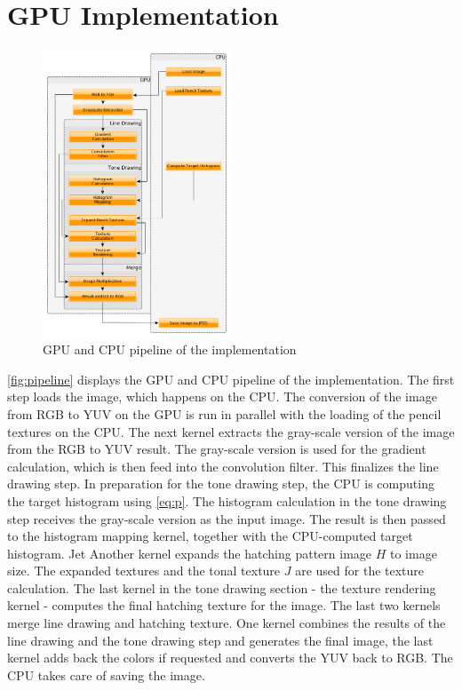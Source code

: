\section{GPU Implementation} \label{gpu-implementation}

\begin{figure}[htb]
  \centering
  \includegraphics[width=0.5\textwidth]{images/pipeline.png}
  \caption{GPU and CPU pipeline of the implementation}
  \label{fig:pipeline}
\end{figure}

\autoref{fig:pipeline} displays the GPU and CPU pipeline of the implementation.
The first step loads the image, which happens on the CPU.  The conversion of
the image from RGB to YUV on the GPU is run in parallel with the loading of the
pencil textures on the CPU.  The next kernel extracts the gray-scale version of
the image from the RGB to YUV result.  The gray-scale version is used for the
gradient calculation, which is then feed into the convolution filter.  This
finalizes the line drawing step.  In preparation for the tone drawing step,
the CPU is computing the target histogram using \autoref{eq:p}.  The histogram
calculation in the tone drawing step receives the gray-scale version as the
input image.  The result is then passed to the histogram mapping kernel,
together with the CPU-computed target histogram. Jet Another kernel expands the
hatching pattern image $H$ to image size.  The expanded textures and the
tonal texture $J$ are used for the texture calculation.  The last kernel
in the tone drawing section - the texture rendering kernel - computes the final
hatching texture for the image.  The last two kernels merge line drawing and
hatching texture. One kernel combines the results of the line drawing and the
tone drawing step and generates the final image, the last kernel adds back the
colors if requested and converts the YUV back to RGB. The CPU takes care of
saving the image.

